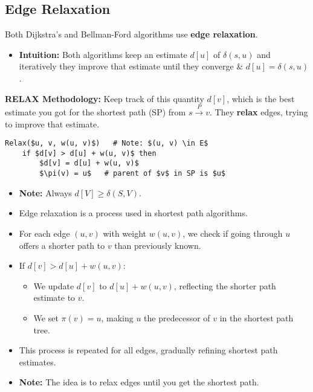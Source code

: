 \subsection{Edge Relaxation}
\begin{definition}
    Both Dijkstra's and Bellman-Ford algorithms use \textbf{edge relaxation}.
    \begin{itemize}
        \item \textbf{Intuition:} Both algorithms keep an estimate $d[u]$ of $\delta(s,u)$ and iteratively they improve that estimate until they converge \& $d[u] = \delta(s,u)$.
    \end{itemize}
    \vspace{1em}

    \textbf{RELAX Methodology:} Keep track of this quantity \( d[v] \), which is the best estimate you got for the shortest path (SP) from \( s \overset{P}{\rightarrow} v \). They \textbf{relax} edges, trying to improve that estimate.

\begin{lstlisting}[mathescape=true]
Relax($u, v, w(u, v)$)   # Note: $(u, v) \in E$
    if $d[v] > d[u] + w(u, v)$ then
        $d[v] = d[u] + w(u, v)$
        $\pi(v) = u$   # parent of $v$ in SP is $u$
\end{lstlisting}
        
    \begin{itemize}
        \item \textbf{Note:} Always \( d[V] \geq \delta(S, V) \).
    \end{itemize}
    \begin{itemize}
        \item Edge relaxation is a process used in shortest path algorithms.
        \item For each edge \((u, v)\) with weight \(w(u, v)\), we check if going through \(u\) offers a shorter path to \(v\) than previously known.
        \item If \(d[v] > d[u] + w(u, v)\):
        \begin{itemize}
            \item We update \(d[v]\) to \(d[u] + w(u, v)\), reflecting the shorter path estimate to \(v\).
            \item We set \(\pi(v) = u\), making \(u\) the predecessor of \(v\) in the shortest path tree.
        \end{itemize}
        \item This process is repeated for all edges, gradually refining shortest path estimates.
    \end{itemize}
    

    \begin{itemize}
        \item \textbf{Note:} The idea is to relax edges until you get the shortest path.
    \end{itemize}
    
\end{definition}

